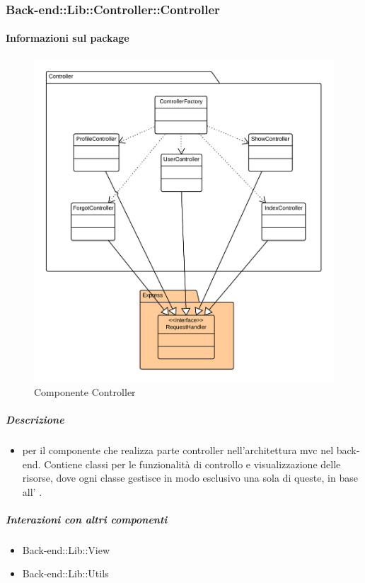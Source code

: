 	\subsubsection{Back-end::Lib::Controller::Controller}
	\paragraph{Informazioni sul package} 
		\begin{figure}[H] 
			\begin{center} 
				\includegraphics[width=\textwidth]{uml/package/Back-end::Lib::Controller::Controller.png}  
				\caption{Componente Controller}
			\end{center}  
		\end{figure} 
	\subparagraph{Descrizione} 
		\begin{itemize}
		\item[]  per il componente che realizza parte controller nell’architettura mvc nel back-
end. Contiene classi per le funzionalità di controllo e visualizzazione delle risorse, dove ogni
classe gestisce in modo esclusivo una sola di queste, in base all’  .

		\end{itemize} 
	\subparagraph{Interazioni con altri componenti} 
		\begin{itemize} 
				\item Back-end::Lib::View
				\item Back-end::Lib::Utils  
		\end{itemize} 
